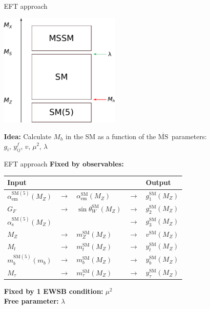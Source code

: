 \documentclass[hyperref={pdfpagelabels=false},ngerman]{beamer}
\renewcommand{\emph}{\textbf}
\newcommand{\MSbar}{\ensuremath{\overline{\text{MS}}}}
\newcommand{\SM}{\ensuremath{\text{SM}}}
\begin{document}
\begin{frame}{EFT approach}
  \begin{center}
    \includegraphics[width=0.45\textwidth]{images/mssm-sm-tower-eft}\\[1em]
  \end{center}
  \emph{Idea:} Calculate $M_h$ in the SM as a function of the \MSbar\ parameters:\\[1em]
  \centering $g_i$, $y^f_{ij}$, $v$, $\mu^2$, $\lambda$
\end{frame}

\begin{frame}{EFT approach}
  \emph{Fixed by observables:}
  \begin{table}
    \centering
    \begin{tabular}{lllll}
      Input & & & & Output \\
      \midrule
      $\alpha_\text{em}^{\SM(5)}(M_Z)$ & $\rightarrow$ & $\alpha_\text{em}^\SM(M_Z)$ & $\rightarrow$ & $g_1^\SM(M_Z)$ \\
      $G_F$ & $\rightarrow$ & $\sin\theta_W^\SM(M_Z)$ & $\rightarrow$ & $g_2^\SM(M_Z)$ \\
      $\alpha_\text{s}^{\SM(5)}(M_Z)$ & & & $\rightarrow$ & $g_3^\SM(M_Z)$ \\
      $M_Z$ & $\rightarrow$ & $m_Z^\SM(M_Z)$ & $\rightarrow$ & $v^\SM(M_Z)$ \\
      $M_t$ & $\rightarrow$ & $m_t^\SM(M_Z)$ & $\rightarrow$ & $y_t^\SM(M_Z)$ \\
      $m_b^{\SM(5)}(m_b)$ & $\rightarrow$ & $m_b^\SM(M_Z)$ & $\rightarrow$ & $y_b^\SM(M_Z)$ \\
      $M_\tau$ & $\rightarrow$ & $m_\tau^\SM(M_Z)$ & $\rightarrow$ & $y_\tau^\SM(M_Z)$ \\
    \end{tabular}
  \end{table}
  \emph{Fixed by 1 EWSB condition:} $\mu^2$ \\[1em]
  \emph{Free parameter:} $\lambda$
\end{frame}
\end{document}
